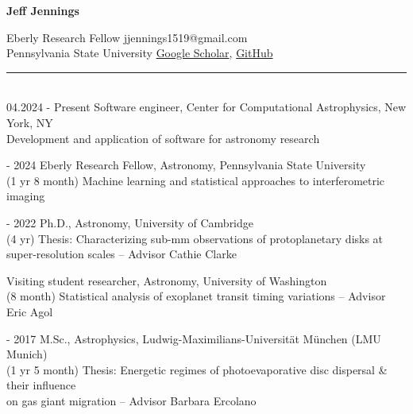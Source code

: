 \documentclass[10pt,preprint]{aastex}
\newcommand*{\xdash}[1][3em]{\rule[0.5ex]{#1}{0.7pt}}
\begin{document}
\begin{center}
{\bf{\large Jeff Jennings}}
\end{center}
Eberly Research Fellow \hfill
\hfill jjennings1519@gmail.com\\
Pennsylvania State University \hfill
\hfill \href{http://bit.ly/jennings_googlescholar}{Google Scholar}, \href{http://github.com/jeffjennings}{GitHub}

 \xdash[69ex] \\ %
04.2024 - Present \-\hspace{1.3cm} Software engineer, Center for Computational Astrophysics, New York, NY \\
\-\hspace{4.51cm}Development and application of software for astronomy research

 - 2024 \-\hspace{2.2cm} Eberly Research Fellow, Astronomy, Pennsylvania State University \\
(1 yr 8 month) \-\hspace{2.1cm}Machine learning and statistical approaches to interferometric imaging

 - 2022 \-\hspace{2.2cm} Ph.D., Astronomy, University of Cambridge \\
(4 yr) \-\hspace{3.5cm}Thesis: Characterizing sub-mm observations of protoplanetary disks at \\
\-\hspace{4.4cm} super-resolution scales -- Advisor Cathie Clarke

 \-\hspace{3.25cm} Visiting student researcher, Astronomy, University of Washington\\
(8 month) \-\hspace{2.85cm}Statistical analysis of exoplanet transit timing variations -- Advisor Eric Agol

 - 2017 \-\hspace{2.2cm} M.Sc., Astrophysics, Ludwig-Maximilians-Universit{\"a}t M{\"u}nchen (LMU Munich)\\
(1 yr 5 month) \-\hspace{2.1cm}Thesis: Energetic regimes of photoevaporative disc dispersal \& their influence \\
\-\hspace{4.55cm}on gas giant migration -- Advisor Barbara Ercolano
\end{document}
